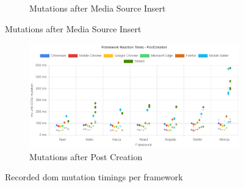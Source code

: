 \documentclass[a4paper, 12pt]{article}
\begin{document}
\begin{figure}[ht!]
\begin{subfigure}{0.8\linewidth}
\begin{center}
    \end{center}
    \caption{Mutations after Media Source Insert}\label{subfig:PW:mediaSourceInsert}
  \end{subfigure}
\end{figure}
\begin{figure}[ht!]\ContinuedFloat
  \begin{subfigure}{0.8\linewidth}
    \begin{center}
      \includegraphics[width=\linewidth, keepaspectratio]{img/playwright-results/userActions_byUserAction/postCreation.png}
    \end{center}
    \caption{Mutations after Post Creation}\label{subfig:PW:postCreation}
  \end{subfigure}
  \caption{Recorded \acrshort{dom} mutation timings per framework}
  \label{fig:playwrightResults:frameworks}
\end{figure}
\end{document}

